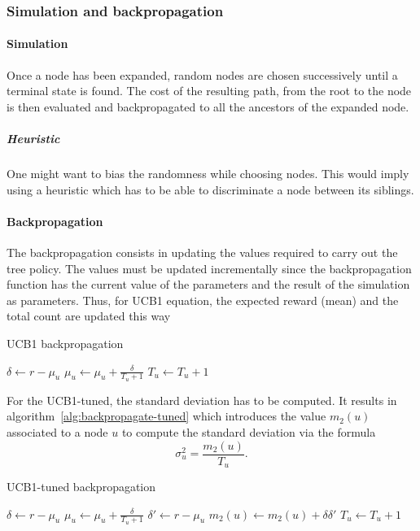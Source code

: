 \documentclass[oneside,twocolumn]{article}
\begin{document}
\subsubsection{Simulation and backpropagation}
\paragraph{Simulation}
Once a node has been expanded, random nodes are chosen successively until a
terminal state is found. The cost of the resulting path, from the root to the
node is then evaluated and backpropagated to all the ancestors of the expanded
node.

\subparagraph{Heuristic} One might want to bias the randomness while choosing
nodes. This would imply using a heuristic which has to be able to discriminate
a node between its siblings.

\paragraph{Backpropagation}
The backpropagation consists in updating the values required to carry out the
tree policy. The values must be updated incrementally since the backpropagation
function has the current value of the parameters and the result of the
simulation as parameters. Thus, for UCB1 equation, the expected reward (mean)
and the total count are updated this way
\begin{algorithm}
  \caption{UCB1 backpropagation}
  \begin{algorithmic}
    \State{}\(\delta \gets r - \mu_u\)
    \State{}\(\mu_u \gets \mu_u + \frac{\delta}{T_u + 1}\)
    \State{}\(T_u \gets T_u + 1\)
    \EndProcedure{}
  \end{algorithmic}
\end{algorithm}

For the UCB1-tuned, the standard deviation has to be computed. It results in
algorithm~\ref{alg:backpropagate-tuned} which introduces the value \(m_2(u)\)
associated to a node \(u\) to compute the standard deviation via the formula
\begin{equation}
  \sigma^2_u = \frac{m_2(u)}{T_u}.
\end{equation}
\begin{algorithm}
  \caption{UCB1-tuned backpropagation}\label{alg:backpropagate-tuned}
  \begin{algorithmic}
    \State{}\(\delta \gets r - \mu_u\)
    \State{}\(\mu_u \gets \mu_u + \frac{\delta}{T_u + 1}\)
    \State{}\(\delta' \gets r - \mu_u\)
    \State{}\(m_2(u) \gets m_2(u) + \delta \delta'\)
    \State{}\(T_u \gets T_u + 1\)
    \EndProcedure{}
  \end{algorithmic}
\end{algorithm}
\end{document}
